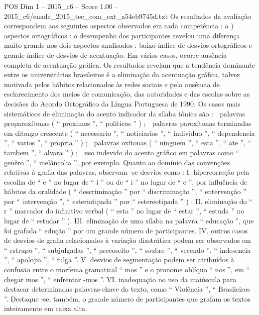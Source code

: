 \begin{textsample}{POS Dim 1 – 2015\_c6 – Score 1.00 – 2015\_c6/enade\_2015\_tec\_com\_ext\_a54eb9745d.txt}
Os resultados da avaliação correspondem aos seguintes aspectos observados em cada competência : a ) aspectos ortográficos : o desempenho dos participantes revelou uma diferença muito grande nos dois aspectos analisados : baixo índice de desvios ortográficos e grande índice de desvios de acentuação.
Em vários casos, ocorre ausência completa de acentuação gráfica.
Os resultados revelam que a tendência dominante entre os universitários brasileiros é a eliminação da acentuação gráfica, talvez motivada pelos hábitos relacionados às redes sociais e pela ausência de esclarecimento dos meios de comunicação, das autoridades e das escolas sobre as decisões do Acordo Ortográfico da Língua Portuguesa de 1990.
Os casos mais sistemáticos de eliminação do acento indicador da sílaba tônica são :  palavras proparoxítonas ( “ proximos ”, “ politicos ” ) ;  palavras paroxítonas terminadas em ditongo crescente ( “ necessario ”, “ noticiarios ”, “ individuo ”, “ dependencia ”, “ varios ”, “ propria ” ) ;  palavras oxítonas ( “ ninguem ”, “ esta ”, “ ate ”, “ tambem ”, “ alvara ” ) ;  uso indevido do acento gráfico em palavras como “ genêro ”, “ melâncolia ”, por exemplo.
Quanto ao domínio das convenções relativas à grafia das palavras, observam -se desvios como : I. hipercorreção pela escolha de “ e ” no lugar de “ i ” ou de “ i ” no lugar de “ e ”, por influência de hábitos da oralidade ( “ descriminação ” por “ discriminação ”, “ entervenção ” por “ intervenção ”, “ esteriotipada ” por “ estereotipada ” ) ; II. eliminação do “ r ” marcador do infinitivo verbal ( “ esta ” no lugar de “ estar ”, “ estuda ” no lugar de “ estudar ” ).
III. eliminação de uma sílaba na palavra “ educação ”, que foi grafada “ edução ” por um grande número de participantes.
IV. outros casos de desvios de grafia relacionados à variação diastrática podem ser observados em “ estrupo ”, “ subjulgadas ”, “ precoseito ”, “ soubre ”, “ vecendo ”, “ indesencia ”, “ apolojia ”, “ fulga ”.
V. desvios de segmentação podem ser atribuídos à confusão entre o morfema gramatical “ mos ” e o pronome oblíquo “ nos ”, em “ chegar mos ”, “ enfrentar -mos ”.
VI. inadequação no uso da maiúscula para destacar determinadas palavras-chave do texto, como “ Violência ”, “ Brasileiros ”.
Destaque -se, também, o grande número de participantes que grafam os textos inteiramente em caixa alta.

\end{textsample}
